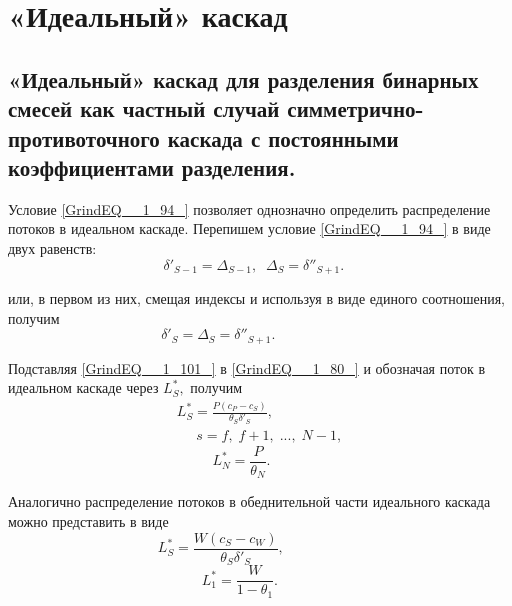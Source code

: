 \section{«Идеальный» каскад}

\subsection{«Идеальный» каскад для разделения бинарных смесей как частный случай симметрично-противоточного каскада с постоянными коэффициентами разделения.}

Условие \ref{GrindEQ__1_94_} позволяет однозначно определить распределение потоков в идеальном каскаде. Перепишем условие \ref{GrindEQ__1_94_} в виде двух равенств:
\begin{equation} \label{GrindEQ__1_100_} 
\delta '_{S-1} =\Delta _{S-1} ,\; \; \Delta _{S} =\delta ''_{S+1} .~~~                         ~ 
\end{equation} 

или, в первом из них, смещая индексы и используя  в виде единого соотношения, получим
\begin{equation} \label{GrindEQ__1_101_} 
\delta '_{S} =\Delta _{S} =\delta ''_{S+1} .~~~~~~~~~~~            ~~~~~~~~~~~~~~~~ 
\end{equation} 

Подставляя \ref{GrindEQ__1_101_} в \ref{GrindEQ__1_80_} и обозначая поток в идеальном каскаде через $L_{S}^{*} ,$ получим
\begin{equation} \label{GrindEQ__1_102_} 
\begin{array}{l} {L_{S}^{*} =\frac{P(c_{P} -c_{S} )}{\theta _{S} \delta '_{S} } ,} \\ {\; \; \; \; \; s=f,\; f+1,\; ...,\; N-1,} \end{array} 
\end{equation} 
\begin{equation} \label{GrindEQ__1_103_} 
L_{N}^{*} =\frac{P}{\theta _{N} } .  ~~~~~              ~~~~~~~ 
\end{equation} 

Аналогично распределение потоков в обеднительной части идеального каскада можно представить в виде
\begin{equation} \label{GrindEQ__1_104_} 
L_{S}^{*} =\frac{W(c_{S} -c_{W} )}{\theta _{S} \delta '_{S} } ,~~~~~~~~~~~~~~~~~~~~        ~~~~~ 
\end{equation} 
\begin{equation} \label{GrindEQ__1_105_} 
L_{1}^{*} =\frac{W}{1-\theta _{1} } .  ~~~             ~~~~~~~~~~ 
\end{equation} 

